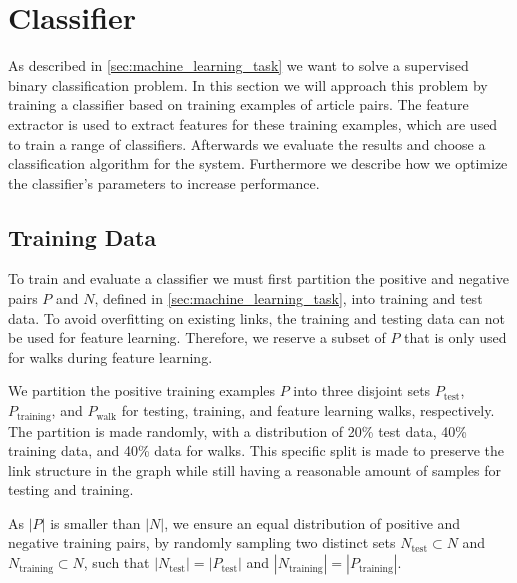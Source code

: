 \section{Classifier}\label{sec:classifier}
As described in \cref{sec:machine_learning_task} we want to solve a supervised binary classification problem. In this section we will approach this problem by training a classifier based on training examples of article pairs. The feature extractor is used to extract features for these training examples, which are used to train a range of classifiers. Afterwards we evaluate the results and choose a classification algorithm for the system. Furthermore we describe how we optimize the classifier's parameters to increase performance.

\subsection{Training Data}\label{sec:training_data}
To train and evaluate a classifier we must first partition the positive and negative pairs $P$ and $N$, defined in \cref{sec:machine_learning_task}, into training and test data. To avoid overfitting on existing links, the training and testing data can not be used for feature learning. Therefore, we reserve a subset of $P$ that is only used for walks during feature learning.

We partition the positive training examples $P$ into three disjoint sets $P_\text{test}$, $P_\text{training}$, and $P_\text{walk}$ for testing, training, and feature learning walks, respectively. The partition is made randomly, with a distribution of 20\% test data, 40\% training data, and 40\% data for walks. This specific split is made to preserve the link structure in the graph while still having a reasonable amount of samples for testing and training.



As $\left\vert{P}\right\vert$ is smaller than $\left\vert{N}\right\vert$, we ensure an equal distribution of positive and negative training pairs, by randomly sampling two distinct sets $N_\text{test} \subset N$ and $N_\text{training} \subset N$, such that $\left\vert{N_\text{test}}\right\vert=\left\vert{P_\text{test}}\right\vert$ and $\left\vert{N_\text{training}}\right\vert=\left\vert{P_\text{training}}\right\vert$.

